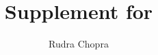 \documentclass[letterpaper]{article}
\title{Supplement for \VERAPaperDisplayTitle}
\author{Rudra Chopra}
\begin{document}
\maketitle

\nocite{*}

\end{document}
